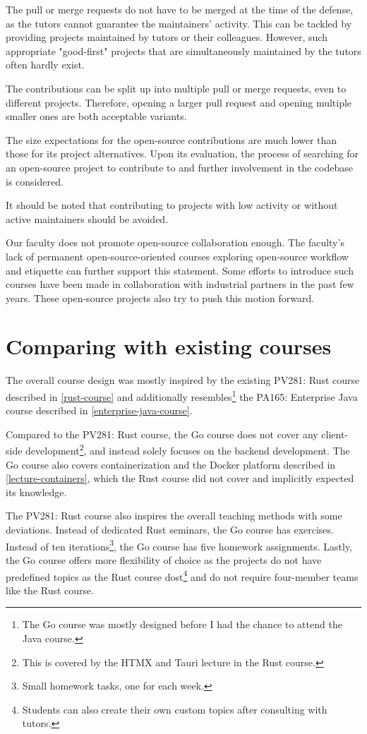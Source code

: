 \documentclass[
  digital,
  color,
  oneside,
  nosansbold,
  nocolorbold,
  nolof,
  nolot,
]{fithesis4}
\begin{document}
The pull or merge requests do not have to be merged at the time of the defense, as the tutors cannot guarantee the maintainers' activity. This can be tackled by providing projects maintained by tutors or their colleagues. However, such appropriate "good-first" projects that are simultaneously maintained by the tutors often hardly exist.

The contributions can be split up into multiple pull or merge requests, even to different projects. Therefore, opening a larger pull request and opening multiple smaller ones are both acceptable variants.

The size expectations for the open-source contributions are much lower than those for its project alternatives. Upon its evaluation, the process of searching for an open-source project to contribute to and further involvement in the codebase is considered.

It should be noted that contributing to projects with low activity or without active maintainers should be avoided.

Our faculty does not promote open-source collaboration enough. The faculty's lack of permanent open-source-oriented courses exploring open-source workflow and etiquette can further support this statement. Some efforts to introduce such courses have been made in collaboration with industrial partners in the past few years. These open-source projects also try to push this motion forward.

\section{Comparing with existing courses}\label{reflect-course}

The overall course design was mostly inspired by the existing PV281: Rust course described in \cref{rust-course} and additionally resembles\footnote{The Go course was mostly designed before I had the chance to attend the Java course.} the PA165: Enterprise Java course described in \cref{enterprise-java-course}.

Compared to the PV281: Rust course, the Go course does not cover any client-side development\footnote{This is covered by the HTMX and Tauri lecture in the Rust course.}, and instead solely focuses on the backend development. The Go course also covers containerization and the Docker platform described in \cref{lecture-containers}, which the Rust course did not cover and implicitly expected its knowledge. 

The PV281: Rust course also inspires the overall teaching methods with some deviations. Instead of dedicated Rust seminars, the Go course has exercises. Instead of ten iterations\footnote{Small homework tasks, one for each week.}, the Go course has five homework assignments. Lastly, the Go course offers more flexibility of choice as the projects do not have predefined topics as the Rust course dost\footnote{Students can also create their own custom topics after consulting with tutors.} and do not require four-member teams like the Rust course.
\end{document}
